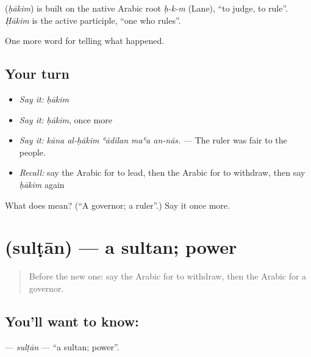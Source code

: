 \begin{cousinweb}
\textbf{} (\emph{ḥākim}) is built on the native Arabic root \emph{ḥ-k-m} (Lane), \textquotedblleft{}to judge, to rule\textquotedblright{}. \emph{Ḥākim} is the active participle, \textquotedblleft{}one who rules\textquotedblright{}.
\end{cousinweb}

\begin{grammarlens}[title={What you've built}]
One more word for telling what happened.
\end{grammarlens}

\subsection*{Your turn}
\begin{itemize}
\raggedright
  \item \emph{Say it:} \emph{ḥākim}
  \item \emph{Say it:} \emph{ḥākim}, once more
  \item \emph{Say it:} \emph{kāna al-ḥākim ʿādilan maʿa an-nās.} — The ruler was fair to the people.
  \item \emph{Recall:} say the Arabic for to lead, then the Arabic for to withdraw, then say \emph{ḥākim} again
\end{itemize}

\begin{tcolorbox}[breakable,colback=teal!4,colframe=teal!35!black,title={Before you move on}]
What does  mean? (\textquotedblleft{}A governor; a ruler\textquotedblright{}.) Say it once more.
\end{tcolorbox}
\section[\texorpdfstring{\ar{سلطان} (sulṭān)}{سلطان (sulṭān)}]{ (sulṭān) — a sultan; power}

\label{lesson:AR-C340-sultan}



\begin{quote}
Before the new one: say the Arabic for to withdraw, then the Arabic for a governor.
\end{quote}

\subsection*{You'll want to know: }
\textbf{} — \emph{sulṭān} — \textquotedblleft{}a sultan; power\textquotedblright{}.

